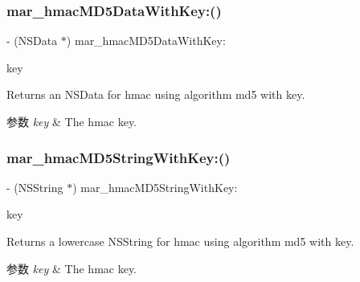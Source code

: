 \subsubsection{\texorpdfstring{mar\+\_\+hmac\+M\+D5\+Data\+With\+Key\+:()}{mar\_hmacMD5DataWithKey:()}}
{\footnotesize\ttfamily -\/ (N\+S\+Data $\ast$) mar\+\_\+hmac\+M\+D5\+Data\+With\+Key\+: \begin{DoxyParamCaption}\item[{(N\+S\+Data $\ast$)}]{key }\end{DoxyParamCaption}}

Returns an N\+S\+Data for hmac using algorithm md5 with key. 
\begin{DoxyParams}{参数}
{\em key} & The hmac key. \\
\hline
\end{DoxyParams}
\mbox{\label{category_n_s_data_07_m_a_r_e_x_08_a0c49192cd142b1db6199b9164ed559df}} 
\subsubsection{\texorpdfstring{mar\+\_\+hmac\+M\+D5\+String\+With\+Key\+:()}{mar\_hmacMD5StringWithKey:()}}
{\footnotesize\ttfamily -\/ (N\+S\+String $\ast$) mar\+\_\+hmac\+M\+D5\+String\+With\+Key\+: \begin{DoxyParamCaption}\item[{(N\+S\+String $\ast$)}]{key }\end{DoxyParamCaption}}

Returns a lowercase N\+S\+String for hmac using algorithm md5 with key. 
\begin{DoxyParams}{参数}
{\em key} & The hmac key. \\
\hline
\end{DoxyParams}
\mbox{\label{category_n_s_data_07_m_a_r_e_x_08_ab391c584364cc64655547a40322de64d}} 
